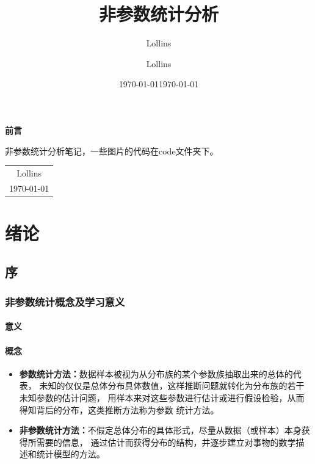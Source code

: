 \documentclass[lang=cn,10pt]{elegantbook}
\author{Lollins}
\date{\today}
\begin{document}
\title{非参数统计分析}
\author{Lollins}
\date{\today}

\maketitle

\setcounter{page}{1}

\begin{center}
    \Huge\textbf{前言}
\end{center}
\par
非参数统计分析笔记，一些图片的代码在code文件夹下。


\begin{flushright}
    \begin{tabular}{c}
        Lollins \\
        \today
    \end{tabular}
\end{flushright}

\newpage
{}
\setcounter{page}{1}
\tableofcontents
\newpage
\setcounter{page}{1}

\chapter{绪论}
\section{序}
\subsection{非参数统计概念及学习意义}
\subsubsection{意义}
\subsubsection{概念}
\begin{itemize}
    \item \textbf{参数统计方法：}数据样本被视为从分布族的某个参数族抽取出来的总体的代表，
          未知的仅仅是总体分布具体数值，这样推断问题就转化为分布族的若干未知参数的估计问题，
          用样本来对这些参数进行估计或进行假设检验，从而得知背后的分布，这类推断方法称为参数
          统计方法。
    \item \textbf{非参数统计方法：}不假定总体分布的具体形式，尽量从数据（或样本）本身获得所需要的信息，
          通过估计而获得分布的结构，并逐步建立对事物的数学描述和统计模型的方法。
\end{itemize}
\end{document}
